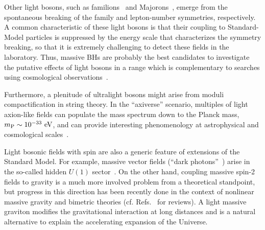 \documentclass[11pt]{article}
\numberwithin{equation}{section} %
\begin{document}
Other light bosons, such as familions~\cite{Wilczek:1982rv} and Majorons~\cite{Chikashige1981265}, emerge from the spontaneous breaking of the family and lepton-number symmetries, respectively.
A common characteristic of these light bosons is that their coupling to Standard-Model particles is suppressed by the energy scale that characterizes the symmetry breaking, so that it is extremely challenging to detect these fields in the laboratory. Thus, massive BHs are probably the best candidates to investigate the putative effects of light bosons in a range which is complementary to searches using cosmological observations~\cite{Hlozek:2014lca}.

Furthermore, a plenitude of ultralight bosons might arise from moduli compactification in string theory. In the ``axiverse'' scenario, multiples of light axion-like fields can populate the mass spectrum down to the Planck mass, $m_{\rm P}\sim10^{-33}~{\rm eV}$, and can provide interesting phenomenology at astrophysical and cosmological scales~\cite{Arvanitaki:2009fg,Mehta:2020kwu}.


Light bosonic fields with spin are also a generic feature of extensions of the Standard Model. For example, massive vector fields (``dark photons''~\cite{Ackerman:mha,Nakayama:2019rhg}) arise in the so-called hidden $U(1)$ sector~\cite{Goodsell:2009xc,Jaeckel:2010ni,Camara:2011jg,Goldhaber:2008xy,Hewett:2012ns}. 
On the other hand, coupling massive spin-2 fields to gravity is a much more involved problem from a theoretical standpoint, but progress in this direction has been recently done in the context of nonlinear massive gravity and bimetric theories (cf. Refs.~\cite{Hinterbichler:2011tt,deRham:2014zqa} for reviews). A light massive graviton modifies the gravitational interaction at long distances and is a natural alternative to explain the accelerating expansion of the Universe.
\end{document}
